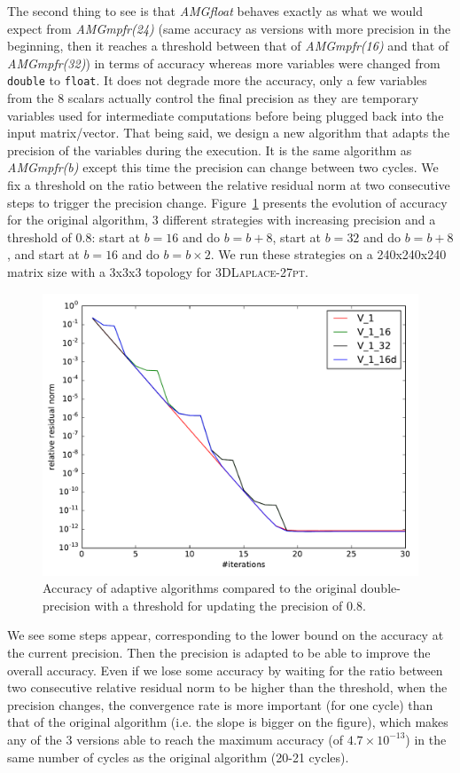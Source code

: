    The second thing to see is that \emph{AMGfloat} behaves exactly as what we would expect from \emph{AMGmpfr(24)} (same accuracy as versions with more precision in the beginning, then it reaches a threshold between that of \emph{AMGmpfr(16)} and that of \emph{AMGmpfr(32)}) in terms of accuracy whereas more variables were changed from \texttt{double} to \texttt{float}. It does not degrade more the accuracy, only a few variables
   from the 8 scalars actually control the final precision as they are temporary variables used for intermediate computations before being plugged back into the input matrix/vector.
   That being said, we design a new algorithm that adapts the precision of the variables during the execution. It is the same algorithm as \emph{AMGmpfr(b)} except this time the precision can change between two cycles.
   We fix a threshold on the ratio between the relative residual norm at two consecutive steps to trigger the precision change.
   Figure~\ref{fig.prec_incr} presents the evolution of accuracy for the original algorithm, 3 different strategies with increasing precision and a threshold of 0.8: start at $b=16$ and do $b=b+8$, start at $b=32$
   and do $b=b+8$, and start at $b=16$ and do $b=b\times2$. We run these strategies on a 240x240x240 matrix size with a 3x3x3 topology for \textsc{3DLaplace-27pt}.
   
   \begin{figure} \centering
    \includegraphics[width=0.8\linewidth]{figs/prec_incr.pdf}
    \caption{Accuracy of adaptive algorithms compared to the original double-precision with a threshold for updating the precision of $0.8$.}
    \label{fig.prec_incr}
   \end{figure}
   
   We see some steps appear, corresponding to the lower bound on the accuracy at the current precision. Then the precision is adapted to be able to improve the overall accuracy. Even if we lose some accuracy by waiting for the ratio
   between two consecutive relative residual norm to be higher than the threshold, when the precision changes, the convergence rate is more important (for one cycle) than that of the original algorithm (i.e. the slope is bigger on the figure), which makes any of
   the 3 versions able to reach the maximum accuracy (of $4.7\times 10^{-13}$) in the same number of cycles as the original algorithm (20-21 cycles).
   
